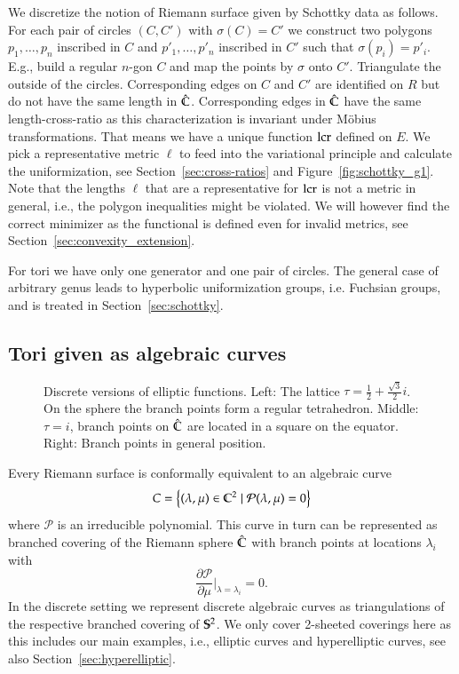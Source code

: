 \documentclass[Thesis]{subfiles}
\begin{document}
We discretize the notion of Riemann surface given by Schottky data as follows.
For each pair of circles $(C, C')$ with $\sigma(C) =C'$ we construct two polygons $p_1,\ldots,p_n$ inscribed in $C$ and $p'_1,\ldots,p'_n$ inscribed in $C'$ such that $\sigma(p_i)=p'_i$. E.g., build a regular $n$-gon $C$ and map the points by $\sigma$ onto $C'$.
Triangulate the outside of the circles.
Corresponding edges on $C$ and $C'$ are identified on $R$ but do not have the same length in $\Chat$.
Corresponding edges in $\Chat$ have the same length-cross-ratio as this characterization is invariant under M\"{o}bius transformations.
That means we have a unique function $\lcr$ defined on $E$.
We pick a representative metric $\ell$ to feed into the variational principle and calculate the uniformization, see Section~\ref{sec:cross-ratios} and Figure~\ref{fig:schottky_g1}.
Note that the lengths $\ell$ that are a representative for $\lcr$ is not a metric in general, i.e., the polygon inequalities might be violated. 
We will however find the correct minimizer as the functional is defined even for invalid metrics, see Section~\ref{sec:convexity_extension}.

For tori we have only one generator and one pair of circles. 
The general case of arbitrary genus leads to hyperbolic uniformization groups, i.e. Fuchsian groups, and is treated in Section~\ref{sec:schottky}.

\subsection{Tori given as algebraic curves}
\label{sec:discrete_algebraic_curves}

\begin{figure}
\centering
{}
\caption{Discrete versions of elliptic functions. Left: The lattice $\tau=\frac{1}{2}+\frac{\sqrt 3}{2}i$. On the sphere the branch points form a regular tetrahedron. Middle: $\tau=i$, branch points on $\hat \C$ are located in a square on the equator. Right: Branch points in general position.}
\label{fig:p_functions}
\end{figure}

Every Riemann surface is conformally equivalent to an algebraic curve
\[C=\left\{(\lambda,\mu)\in \C^2 \mid \mathcal P(\lambda,\mu)=0\right\}\]
where $\mathcal P$ is an irreducible polynomial.
This curve in turn can be represented as branched covering of the Riemann sphere $\hat{\C}$ with branch points at locations $\lambda_i$ with \[\frac{\partial\mathcal P}{\partial \mu}\Bigr|_{\lambda=\lambda_i} = 0.\]
In the discrete setting we represent discrete algebraic curves as triangulations of the respective branched covering of $\S^2$.
We only cover 2-sheeted coverings here as this includes our main examples, i.e., elliptic curves and hyperelliptic curves, see also Section~\ref{sec:hyperelliptic}.
\end{document}
